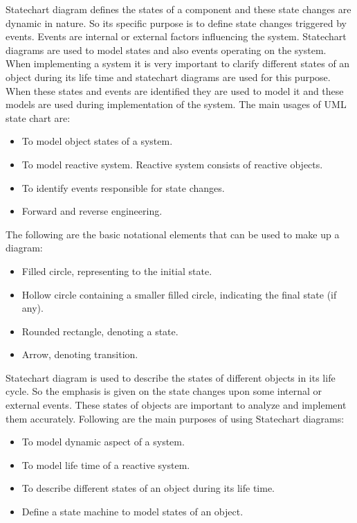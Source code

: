 Statechart diagram defines the states of a component and these state changes are dynamic in nature. So its specific purpose is to define state changes triggered by events. Events are internal or external factors influencing the system. Statechart diagrams are used to model states and also events operating on the system. When implementing a system it is very important to clarify different states of an object during its life time and statechart diagrams are used for this purpose. When these states and events are identified they are used to model it and these models are used during implementation of the system. The main usages of UML state chart are:
\begin{itemize}
	\item To model object states of a system.
	\item To model reactive system. Reactive system consists of reactive objects.
	\item To identify events responsible for state changes.
	\item Forward and reverse engineering.
\end{itemize}

The following are the basic notational elements that can be used to make up a diagram:
\begin{itemize}
	\item Filled circle, representing to the initial state.	
	\item Hollow circle containing a smaller filled circle, indicating the final state (if any).	
	\item Rounded rectangle, denoting a state.	
	\item Arrow, denoting transition.	
\end{itemize}

Statechart diagram is used to describe the states of different objects in its life cycle. So the emphasis is given on the state changes upon some internal or external events. These states of objects are important to analyze and implement them accurately. Following are the main purposes of using Statechart diagrams:

\begin{itemize}
	\item To model dynamic aspect of a system.
	
	\item To model life time of a reactive system.
	
	\item To describe different states of an object during its life time.
	
	\item Define a state machine to model states of an object.
\end{itemize}

